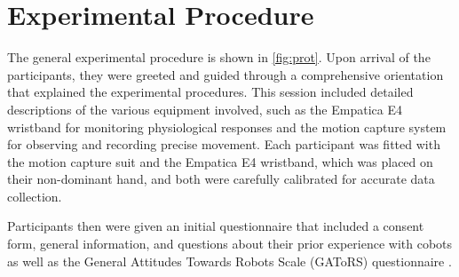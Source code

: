 \section{Experimental Procedure}
The general experimental procedure is shown in \autoref{fig:prot}.
Upon arrival of the participants, they were greeted and guided through a comprehensive orientation that explained the experimental procedures. This session included detailed descriptions of the various equipment involved, such as the Empatica E4 wristband for monitoring physiological responses and the motion capture system for observing and recording precise movement. Each participant was fitted with the motion capture suit and the Empatica E4 wristband, which was placed on their non-dominant hand, and both were carefully calibrated for accurate data collection.

Participants then were given an initial questionnaire that included a consent form, general information, and questions about their prior experience with cobots as well as the General Attitudes Towards Robots Scale (GAToRS) questionnaire \autocite{gatrs}.


